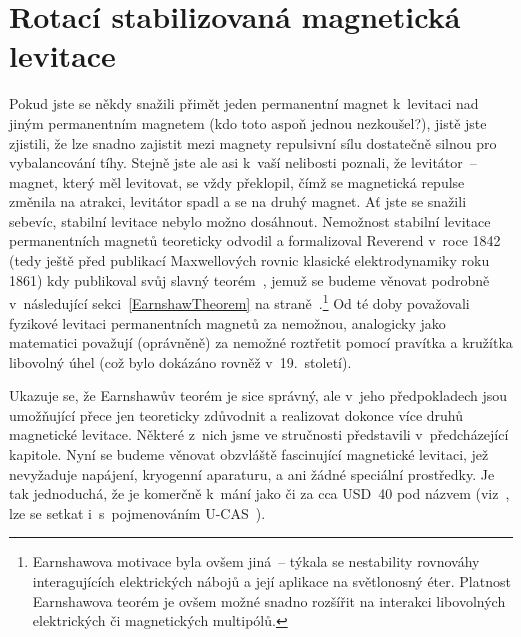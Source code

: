 
\chapter{Rotací stabilizovaná magnetická levitace}\label{SpinLev}%

Pokud jste se někdy snažili přimět jeden permanentní magnet k~levitaci nad
jiným permanentním magnetem (kdo toto aspoň jednou nezkoušel?), jistě jste
zjistili, že lze snadno zajistit mezi magnety repulsivní sílu dostatečně
silnou pro vybalancování tíhy. Stejně jste ale asi k~vaší nelibosti poznali,
že levitátor~-- magnet, který měl levitovat, se vždy překlopil, čímž se
magnetická repulse změnila na atrakci, levitátor spadl a  se na
druhý magnet. Ať jste se snažili sebevíc, stabilní levitace nebylo možno
dosáhnout. Nemožnost stabilní levitace permanentních magnetů teoreticky
odvodil a formalizoval Reverend  v~roce 1842
(tedy ještě před publikací Maxwellových rovnic klasické elektrodynamiky roku
1861) kdy publikoval svůj slavný
teorém~\cite{Ear:1842:TCAMPS:NatMoFoConsLumEth,%
  Bas:2006:MECJI:EarnshawMagLev}, jemuž se budeme věnovat podrobně
v~následující sekci~\ref{EarnshawTheorem} na
straně~\pageref{EarnshawTheorem}.\footnote{Earnshawova motivace byla ovšem
  jiná~-- týkala se nestability rovnováhy interagujících elektrických nábojů a
  její aplikace na světlonosný éter. Platnost Earnshawova teorém je ovšem
  možné snadno rozšířit na interakci libovolných elektrických či magnetických
  multipólů.} Od té doby považovali fyzikové levitaci permanentních magnetů za
nemožnou, analogicky jako matematici považují (oprávněně) za nemožné roztřetit
pomocí pravítka a kružítka libovolný úhel (což bylo dokázáno rovněž
v~19.~století).

Ukazuje se, že Earnshawův teorém je sice správný, ale v~jeho
předpokladech jsou  umožňující přece jen teoreticky
zdůvodnit a realizovat dokonce více druhů magnetické levitace. Některé z~nich
jsme ve stručnosti představili v~předcházející kapitole. Nyní se budeme
věnovat obzvláště fascinující magnetické levitaci, jež nevyžaduje napájení,
kryogenní aparaturu, a ani žádné speciální prostředky. Je tak jednoduchá, že
je komerčně k~mání jako  či  za cca USD~40 pod názvem
\Levit{} (viz~\cite{Fas:LIVE:Levit:Levitron,%
  Gra:LIVE:Levit:IgnMagBliss}, lze se setkat i~s~pojmenováním
U-CAS~\cite{Gov-Sht:1999:phys9902002:HowHiUCAS}).

